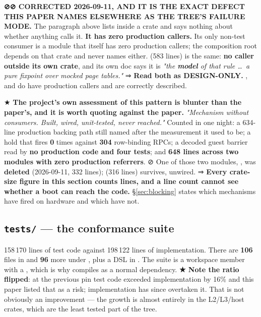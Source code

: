 \documentclass[10.5pt]{article}
\begin{document}
\begin{warnbox}\small
\textbf{⊘⊘ CORRECTED 2026-09-11, AND IT IS THE EXACT DEFECT THIS PAPER NAMES ELSEWHERE AS THE
TREE'S FAILURE MODE.} The paragraph above lists  inside a \built{} crate and says
nothing about whether anything calls it. \textbf{It has zero production callers.} Its only
non-test consumer is a  module that itself has zero production callers; the
composition root depends on that crate and never names either.  (583 lines) is
the same: \textbf{no caller outside its own crate}, and its own doc says it is \emph{"the
\textbf{model} of that rule \dots\ a pure fixpoint over mocked page tables."} ⇒ \textbf{Read
both as DESIGN-ONLY.} ,  and  do have production
callers and are correctly described.

\smallskip
★ \textbf{The project's own assessment of this pattern is blunter than the paper's, and it is
worth quoting against the paper.} \emph{"Mechanism without consumers. Built, wired, unit-tested,
never reached."} Counted in one night: a 634-line production backing path still named
 after the measurement it used to be; a hold that fires
\textbf{0} times against \textbf{304} row-binding RPCs; a decoded guest barrier read by
\textbf{no production code and four tests}; and \textbf{648 lines across two modules with zero
production referrers}. ⊘ One of those two modules, , was \textbf{deleted}
(2026-09-11, 332 lines);  (316 lines) survives, unwired. ⇒ \textbf{Every
crate-size figure in this section counts lines, and a line count cannot see whether a boot can
reach the code.} \S\ref{sec:blocking} states which mechanisms have fired on hardware and which
have not.
\end{warnbox}

\subsection*{\texttt{tests/} --- the conformance suite}
158\,170 lines of test code against 198\,122 lines of implementation. There are \textbf{106} files
in  and \textbf{96} more under , plus a 
DSL in . The suite is a workspace member with a \code{[lib]}, which is why
 compiles as a normal dependency. \textbf{★ Note the ratio flipped}: at the
previous pin test code exceeded implementation by 16\% and this paper listed that as a risk;
implementation has since overtaken it. That is not obviously an improvement — the growth is
almost entirely in the L2/L3/host crates, which are the least tested part of the tree.
\end{document}
